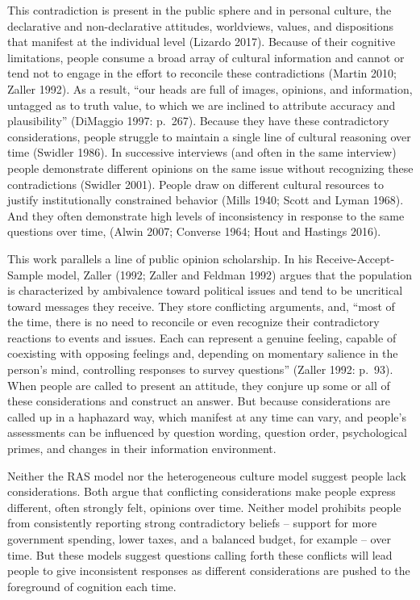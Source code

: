 \documentclass[12pt,]{article}
\begin{document}
This contradiction is present in the public sphere and in personal culture, the declarative and non-declarative attitudes, worldviews, values, and dispositions that manifest at the individual level (Lizardo 2017). Because of their cognitive limitations, people consume a broad array of cultural information and cannot or tend not to engage in the effort to reconcile these contradictions (Martin 2010; Zaller 1992). As a result, ``our heads are full of images, opinions, and information, untagged as to truth value, to which we are inclined to attribute accuracy and plausibility'' (DiMaggio 1997: p.~267). Because they have these contradictory considerations, people struggle to maintain a single line of cultural reasoning over time (Swidler 1986). In successive interviews (and often in the same interview) people demonstrate different opinions on the same issue without recognizing these contradictions (Swidler 2001). People draw on different cultural resources to justify institutionally constrained behavior (Mills 1940; Scott and Lyman 1968). And they often demonstrate high levels of inconsistency in response to the same questions over time, (Alwin 2007; Converse 1964; Hout and Hastings 2016).

This work parallels a line of public opinion scholarship. In his Receive-Accept-Sample model, Zaller (1992; Zaller and Feldman 1992) argues that the population is characterized by ambivalence toward political issues and tend to be uncritical toward messages they receive. They store conflicting arguments, and, ``most of the time, there is no need to reconcile or even recognize their contradictory reactions to events and issues. Each can represent a genuine feeling, capable of coexisting with opposing feelings and, depending on momentary salience in the person's mind, controlling responses to survey questions'' (Zaller 1992: p.~93). When people are called to present an attitude, they conjure up some or all of these considerations and construct an answer. But because considerations are called up in a haphazard way, which manifest at any time can vary, and people's assessments can be influenced by question wording, question order, psychological primes, and changes in their information environment.

Neither the RAS model nor the heterogeneous culture model suggest people lack considerations. Both argue that conflicting considerations make people express different, often strongly felt, opinions over time. Neither model prohibits people from consistently reporting strong contradictory beliefs -- support for more government spending, lower taxes, and a balanced budget, for example -- over time. But these models suggest questions calling forth these conflicts will lead people to give inconsistent responses as different considerations are pushed to the foreground of cognition each time.
\end{document}

